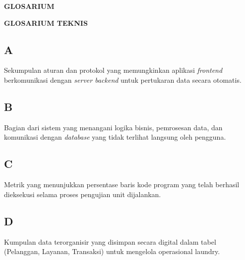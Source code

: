 
\begin{center}
    {\fontsize{14}{16}\selectfont\bfseries GLOSARIUM}
\end{center}

\vspace{1cm}

\noindent
\textbf{GLOSARIUM TEKNIS}

\subsection*{A}
\begin{description}[leftmargin=0pt, labelfont=\bfseries]
    \item[API (\textit{Application Programming Interface}):] Sekumpulan aturan dan protokol yang memungkinkan aplikasi \textit{frontend} berkomunikasi dengan \textit{server backend} untuk pertukaran data secara otomatis.
\end{description}

\subsection*{B}
\begin{description}[leftmargin=0pt, labelfont=\bfseries]
    \item[Backend:] Bagian dari sistem yang menangani logika bisnis, pemrosesan data, dan komunikasi dengan \textit{database} yang tidak terlihat langsung oleh pengguna.
\end{description}

\subsection*{C}
\begin{description}[leftmargin=0pt, labelfont=\bfseries]
    \item[Code Coverage:] Metrik yang menunjukkan persentase baris kode program yang telah berhasil dieksekusi selama proses pengujian unit dijalankan.
\end{description}

\subsection*{D}
\begin{description}[leftmargin=0pt, labelfont=\bfseries]
    \item[Database (Supabase):] Kumpulan data terorganisir yang disimpan secara digital dalam tabel (Pelanggan, Layanan, Transaksi) untuk mengelola operasional laundry.
\end{description}

